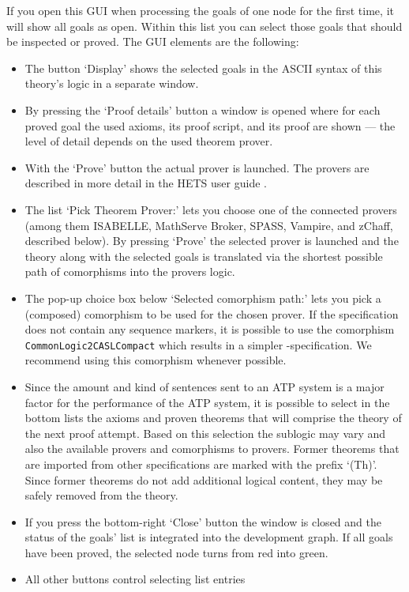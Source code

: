 \documentclass{article}
\newcommand{\normalTEXTSC}[2]{{#1\scriptsize#2}}
\newcommand     {\Hets}{\normalTEXTSC{H}{ETS}\xspace}
\newcommand     {\Isabelle}{\normalTEXTSC{I}{SABELLE}\xspace}
\newcommand     {\SPASS}{\normalTEXTSC{S}{PASS}\xspace}
\begin{document}
If you open this GUI when processing the goals of one node for the
first time, it will show all goals as open. Within this list you can
select those goals that should be inspected or proved. The GUI elements are the following:

\begin{itemize}
\item The button `Display' shows the selected goals in the ASCII syntax of
  this theory's logic in a separate window.
\item By pressing the `Proof details' button a window is opened where for each
  proved goal the used axioms, its proof script, and its proof are shown ---
  the level of detail depends on the used theorem prover.
\item With the `Prove' button the actual prover is launched. The provers are described
  in more detail in the \Hets user guide \cite{HetsUserGuide}.
\item The list `Pick Theorem Prover:' lets you choose one of the connected
  provers (among them \Isabelle, MathServe Broker, \SPASS, Vampire, and
  zChaff, described below). By pressing `Prove' the selected prover is
  launched and the theory along with the selected goals is translated via the
  shortest possible path of comorphisms into the provers logic.
\item The pop-up choice box below `Selected comorphism path:' lets you pick a
  (composed) comorphism to be used for the chosen prover. If the specification
  does not contain any sequence markers, it is possible to use the comorphism
  \texttt{CommonLogic2CASLCompact} which results in a simpler 
  \CASL-specification. We recommend using this comorphism whenever possible.
\item Since the amount and kind of sentences sent to an ATP system is a major
  factor for the performance of the ATP system, it is possible to select in
  the bottom lists the axioms and proven theorems that will comprise the
  theory of the next proof attempt. Based on this selection the sublogic may
  vary and also the available provers and comorphisms to provers. Former
  theorems that are imported from other specifications are marked with the
  prefix `(Th)'. Since former theorems do not add additional logical content,
  they may be safely removed from the theory.
\item If you press the bottom-right `Close' button the window is closed and
  the status of the goals' list is integrated into the development graph. If
  all goals have been proved, the selected node turns from red into green.
\item All other buttons control selecting list entries
\end{itemize}
\end{document}
